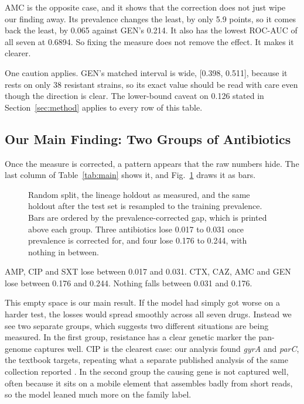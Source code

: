 \documentclass[conference]{IEEEtran}
\begin{document}
AMC is the opposite case, and it shows that the correction does not just wipe our
finding away. Its prevalence changes the least, by only 5.9 points, so it comes back
the least, by 0.065 against GEN's 0.214. It also has the lowest ROC-AUC of all seven
at 0.6894. So fixing the measure does not remove the effect. It makes it clearer.

One caution applies. GEN's matched interval is wide, [0.398, 0.511], because it
rests on only 38 resistant strains, so its exact value should be read with care even
though the direction is clear. The lower-bound caveat on 0.126 stated in
Section~\ref{sec:method} applies to every row of this table.

\subsection{Our Main Finding: Two Groups of Antibiotics}

Once the measure is corrected, a pattern appears that the raw numbers hide. The last
column of Table~\ref{tab:main} shows it, and Fig.~\ref{fig:twogroups} draws it as
bars.

\begin{figure}[t]
\centering
\resizebox{0.9\textwidth}{!}{}
\caption{Random split, the lineage holdout as measured, and the same holdout after
the test set is resampled to the training prevalence. Bars are ordered by the
prevalence-corrected gap, which is printed above each group. Three antibiotics lose
0.017 to 0.031 once prevalence is corrected for, and four lose 0.176 to 0.244, with
nothing in between.}
\label{fig:twogroups}
\end{figure}

AMP, CIP and SXT lose between 0.017 and 0.031. CTX, CAZ, AMC and GEN lose between
0.176 and 0.244. Nothing falls between 0.031 and 0.176.

This empty space is our main result. If the model had simply got worse on a harder
test, the losses would spread smoothly across all seven drugs. Instead we see two
separate groups, which suggests two different situations are being measured. In the
first group, resistance has a clear genetic marker the pan-genome captures well. CIP
is the clearest case: our analysis found \textit{gyrA} and \textit{parC}, the
textbook targets, repeating what a separate published analysis of the same
collection reported \cite{york2025}. In the second group the causing gene is not
captured well, often because it sits on a mobile element that assembles badly from
short reads, so the model leaned much more on the family label.
\end{document}
